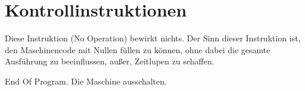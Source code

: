 \section{Kontrollinstruktionen}

Diese Instruktion (\glqq No Operation\grqq) bewirkt nichts.
Der Sinn dieser Instruktion ist, den Maschinencode mit Nullen füllen zu können,
ohne dabei die gesamte Ausführung zu beeinflussen, außer, Zeitlupen zu schaffen. 



\glqq End Of Program\grqq.
Die Maschine ausschalten.
